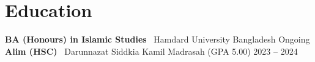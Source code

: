 \documentclass[a4paper,10pt]{article}
\begin{document}
\begin{itemize}
\end{itemize}

\section*{Education}
\textbf{BA (Honours) in Islamic Studies} \textbar\ Hamdard University Bangladesh \hfill Ongoing \\
\textbf{Alim (HSC)} \textbar\ Darunnazat Siddkia Kamil Madrasah (GPA 5.00) \hfill 2023 -- 2024
\end{document}
